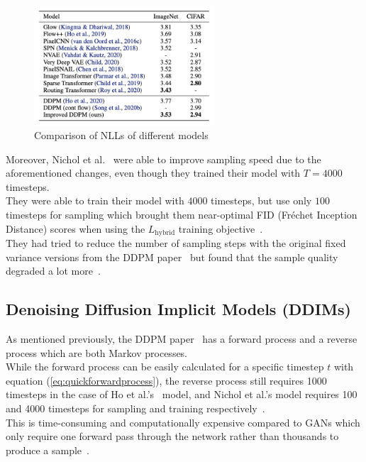 \documentclass[twoside]{article}
\numberwithin{equation}{section}
\numberwithin{figure}{section}
\begin{document}
\begin{figure}[h]
  \begin{center}
    \includegraphics[width= 0.6\textwidth]{images/comparison.png}
    \caption{Comparison of NLLs of different models~\cite{nichol2021improved}}
  \end{center}
\end{figure}

Moreover, Nichol et al.~\cite{nichol2021improved} were able to improve sampling speed due to the aforementioned changes, even though they trained their model with $T = 4000$ timesteps. \\
They were able to train their model with $4000$ timesteps, but use only $100$ timesteps for sampling which brought them near-optimal FID (Fréchet Inception Distance) scores when using the $L_{\text{hybrid}}$ training objective~\cite{nichol2021improved}. \\
They had tried to reduce the number of sampling steps with the original fixed variance versions from the DDPM paper~\cite{ho2020denoising} but found that the sample quality degraded a lot more~\cite{nichol2021improved}.

\newpage

\subsection{Denoising Diffusion Implicit Models (DDIMs)}
As mentioned previously, the DDPM paper~\cite{ho2020denoising} has a forward process and a reverse process which are both Markov processes. \\
While the forward process can be easily calculated for a specific timestep $t$ with equation (\ref{eq:quickforwardprocess}), the reverse process still requires 1000 timesteps in the case of Ho et al.'s~\cite{ho2020denoising} model, and Nichol et al.'s model requires 100 and 4000 timesteps for sampling and training respectively~\cite{nichol2021improved}. \\
This is time-consuming and computationally expensive compared to GANs which only require one forward pass through the network rather than thousands to produce a sample~\cite{song2022denoising}.
\end{document}

